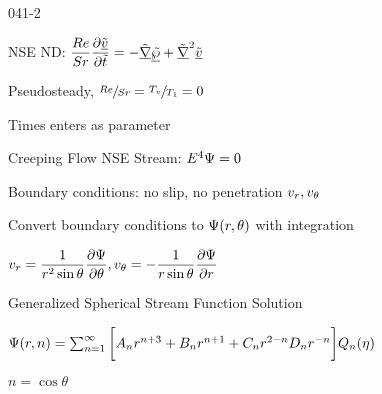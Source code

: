 \begin{mitframe}{041-2}

\begin{listone}

\item NSE ND: $\dfrac{\reynolds}{\strouhal}\dfrac{\partial\uline{\tilde{\vvel}}}{\partial\tilde{t}}=-\tilde{\gradop}\uline{\tilde{\dynpress}}+\tilde{\gradop}^2\uline{\tilde{\vvel}}$
			
            \begin{listtwo}
            \item Pseudosteady, $\sfrac{\reynolds}{\strouhal}=\sfrac{\Temp_{\vvel}}{\Temp_1}=0$
            \item Times enters as parameter
            \end{listtwo}

\item Creeping Flow NSE Stream: $\energy^4\streamfunc=0$
\item Boundary conditions: no slip, no penetration $\vvel_{\pos}, \vvel_{\theta}$


\item Convert boundary conditions to $\streamfunc(\pos, \theta)$ with integration

				\begin{listtwo}
                
                \item $\vvel_{\pos}=\dfrac{1}{\pos^2\sin\theta}\dfrac{\partial\streamfunc}{\partial\theta}, \vvel_{\theta}=-\dfrac{1}{\pos\sin\theta}\dfrac{\partial\streamfunc}{\partial\pos}$

\end{listtwo}

\item Generalized Spherical Stream Function Solution

				\begin{listtwo}
                
                \item $\streamfunc(\pos, n)=\sum\nolimits_{n=1}^{\infty}\bigg[\helmholtz_{n}\pos^{n+3}+\virialcoeff{n}\pos^{n+1}+\conc_{n}\pos^{2-n}\elecdisplace_{n}\pos^{-n}\bigg]\heatflow_{n}(\intrinsvisc)$
                			\begin{listthree}
                            
                            \item $n =\cos\theta$
                            

\end{listthree}
\end{listtwo}
\end{listone}
\end{mitframe}

